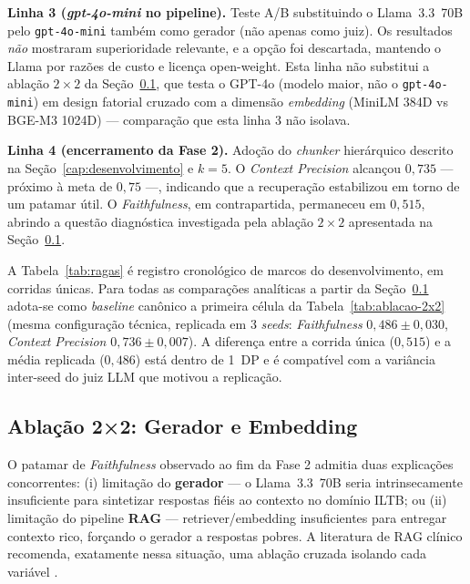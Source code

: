 \documentclass[
  12pt,
  oneside,
  a4paper,
  english,
  brazil
]{abntex2}
\begin{document}
\textbf{Linha 3 (\textit{gpt-4o-mini} no pipeline).} Teste A/B
substituindo o Llama~3.3~70B pelo \texttt{gpt-4o-mini} também como gerador
(não apenas como juiz). Os resultados \textit{não} mostraram superioridade
relevante, e a opção foi descartada, mantendo o Llama por razões de custo e
licença open-weight. Esta linha não substitui a ablação $2 \times 2$ da
Seção~\ref{sec:ablacao-2x2}, que testa o GPT-4o (modelo maior, não o
\texttt{gpt-4o-mini}) em design fatorial cruzado com a dimensão
\emph{embedding} (MiniLM 384D vs BGE-M3 1024D) --- comparação que esta
linha 3 não isolava.

\textbf{Linha 4 (encerramento da Fase 2).} Adoção do \textit{chunker} hierárquico
descrito na Seção~\ref{cap:desenvolvimento} e $k=5$. O \textit{Context Precision}
alcançou $0{,}735$ --- próximo à meta de $0{,}75$ ---, indicando que a recuperação
estabilizou em torno de um patamar útil. O \textit{Faithfulness}, em contrapartida,
permaneceu em $0{,}515$, abrindo a questão diagnóstica investigada pela ablação
$2 \times 2$ apresentada na Seção~\ref{sec:ablacao-2x2}.

A Tabela~\ref{tab:ragas} é registro cronológico de marcos do
desenvolvimento, em corridas únicas. Para todas as comparações
analíticas a partir da Seção~\ref{sec:ablacao-2x2} adota-se como
\emph{baseline} canônico a primeira célula da Tabela~\ref{tab:ablacao-2x2}
(mesma configuração técnica, replicada em 3 \emph{seeds}:
\textit{Faithfulness} $0{,}486 \pm 0{,}030$, \textit{Context Precision}
$0{,}736 \pm 0{,}007$). A diferença entre a corrida única ($0{,}515$) e
a média replicada ($0{,}486$) está dentro de 1~DP e é compatível com a
variância inter-seed do juiz LLM que motivou a replicação.

\subsection{Ablação 2×2: Gerador e Embedding}
\label{sec:ablacao-2x2}

O patamar de \textit{Faithfulness} observado ao fim da Fase 2 admitia duas
explicações concorrentes: (i) limitação do \textbf{gerador} --- o Llama~3.3~70B
seria intrinsecamente insuficiente para sintetizar respostas fiéis ao contexto
no domínio ILTB; ou (ii) limitação do pipeline \textbf{RAG} ---
retriever/embedding insuficientes para entregar contexto rico,
forçando o gerador a respostas pobres. A literatura de RAG clínico recomenda,
exatamente nessa situação, uma ablação cruzada isolando cada variável
\cite{ocaf2024, wang2024bestpractices}.
\end{document}
